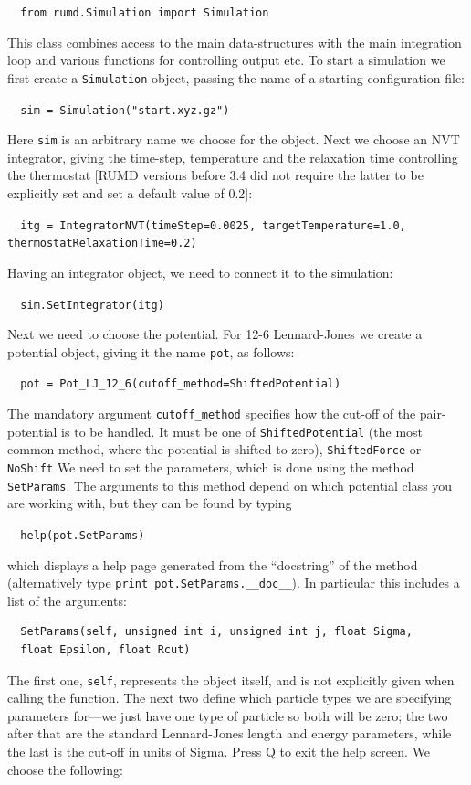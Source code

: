 \verb|  from rumd.Simulation import Simulation|

This class combines access to the main data-structures 
with the main integration loop and various functions for controlling output 
etc. To start a simulation we first 
create a \verb|Simulation| object, passing the 
name of a starting configuration file:

\verb|  sim = Simulation("start.xyz.gz")|

Here \verb|sim| is an arbitrary name we choose for the object.
Next we choose an NVT integrator, giving the time-step,  temperature and the relaxation time controlling the thermostat [RUMD versions before 3.4 did not require the latter to be explicitly set and set a default value of 0.2]:

\verb|  itg = IntegratorNVT(timeStep=0.0025, targetTemperature=1.0, thermostatRelaxationTime=0.2)|

Having an integrator object, we need to connect it to the simulation:

\verb|  sim.SetIntegrator(itg)|

Next we need to choose the potential. For 12-6 Lennard-Jones we create a 
potential object, giving it the name \verb|pot|, as follows:

\verb|  pot = Pot_LJ_12_6(cutoff_method=ShiftedPotential)|
 
The mandatory argument \verb|cutoff_method| specifies how the cut-off of
the pair-potential is to be handled. It must be one of
\verb|ShiftedPotential| (the most common method, where the potential is
shifted to zero), \verb|ShiftedForce| or \verb|NoShift|
We need to set the parameters, which is done using the method \verb|SetParams|.
The arguments to this method depend on which potential class you are
working with, but they can be found by typing

\verb|  help(pot.SetParams)|

which displays a help page generated from the ``docstring'' of the method
(alternatively type \verb|print pot.SetParams.__doc__|).
In particular this includes a list of the arguments:

\begin{verbatim}
  SetParams(self, unsigned int i, unsigned int j, float Sigma, 
  float Epsilon, float Rcut)
\end{verbatim}


The first one, \verb|self|, represents the object itself, and is not explicitly
given when calling the function. The next two define which particle types we
are specifying parameters for---we just have one type of particle so both will
be zero; the two after that are the standard Lennard-Jones length and energy
parameters, while the last is the cut-off in units of Sigma. Press Q to exit
the help screen. We choose the following:

